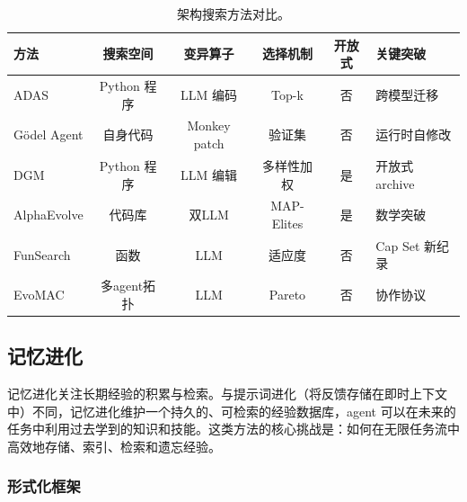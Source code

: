 \begin{table}[htbp]
\centering
\caption{架构搜索方法对比。}
\label{tab:arch-compare}
\begin{tabular}{lccccp{35mm}}
\toprule
\textbf{方法} & \textbf{搜索空间} & \textbf{变异算子} & \textbf{选择机制} & \textbf{开放式} & \textbf{关键突破} \\
\midrule
ADAS & Python 程序 & LLM 编码 & Top-k & 否 & 跨模型迁移 \\
Gödel Agent & 自身代码 & Monkey patch & 验证集 & 否 & 运行时自修改 \\
DGM & Python 程序 & LLM 编辑 & 多样性加权 & 是 & 开放式 archive \\
AlphaEvolve & 代码库 & 双LLM & MAP-Elites & 是 & 数学突破 \\
FunSearch & 函数 & LLM & 适应度 & 否 & Cap Set 新纪录 \\
EvoMAC & 多agent拓扑 & LLM & Pareto & 否 & 协作协议 \\
\bottomrule
\end{tabular}
\end{table}

\subsection{记忆进化}\label{sec:memory}

记忆进化关注长期经验的积累与检索。与提示词进化（将反馈存储在即时上下文中）不同，记忆进化维护一个持久的、可检索的经验数据库，agent 可以在未来的任务中利用过去学到的知识和技能。这类方法的核心挑战是：如何在无限任务流中高效地存储、索引、检索和遗忘经验。

\subsubsection{形式化框架}

